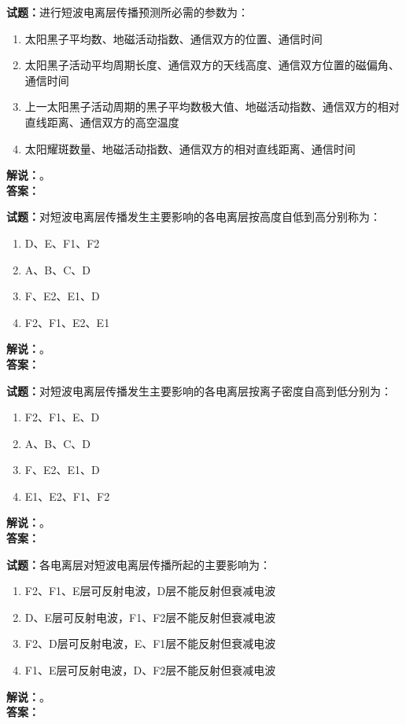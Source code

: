 \documentclass{ctexbook}
\begin{document}
\vspace{\baselineskip}

\noindent\textbf{试题：}进行短波电离层传播预测所必需的参数为：
\begin{enumerate}[leftmargin=3em]
  \item 太阳黑子平均数、地磁活动指数、通信双方的位置、通信时间
  \item 太阳黑子活动平均周期长度、通信双方的天线高度、通信双方位置的磁偏角、通信时间
  \item 上一太阳黑子活动周期的黑子平均数极大值、地磁活动指数、通信双方的相对直线距离、通信双方的高空温度
  \item 太阳耀斑数量、地磁活动指数、通信双方的相对直线距离、通信时间
\end{enumerate}
\noindent\textbf{解说：}\textbf{}。\\\noindent\textbf{答案：}

\vspace{\baselineskip}

\noindent\textbf{试题：}对短波电离层传播发生主要影响的各电离层按高度自低到高分别称为：
\begin{enumerate}[leftmargin=3em]
  \item D、E、F1、F2
  \item A、B、C、D
  \item F、E2、E1、D
  \item F2、F1、E2、E1
\end{enumerate}
\noindent\textbf{解说：}\textbf{}。\\\noindent\textbf{答案：}

\vspace{\baselineskip}

\noindent\textbf{试题：}对短波电离层传播发生主要影响的各电离层按离子密度自高到低分别为：
\begin{enumerate}[leftmargin=3em]
  \item F2、F1、E、D
  \item A、B、C、D
  \item F、E2、E1、D
  \item E1、E2、F1、F2
\end{enumerate}
\noindent\textbf{解说：}\textbf{}。\\\noindent\textbf{答案：}

\vspace{\baselineskip}

\noindent\textbf{试题：}各电离层对短波电离层传播所起的主要影响为：
\begin{enumerate}[leftmargin=3em]
  \item F2、F1、E层可反射电波，D层不能反射但衰减电波
  \item D、E层可反射电波，F1、F2层不能反射但衰减电波
  \item F2、D层可反射电波，E、F1层不能反射但衰减电波
  \item F1、E层可反射电波，D、F2层不能反射但衰减电波
\end{enumerate}
\noindent\textbf{解说：}\textbf{}。\\\noindent\textbf{答案：}
\end{document}
